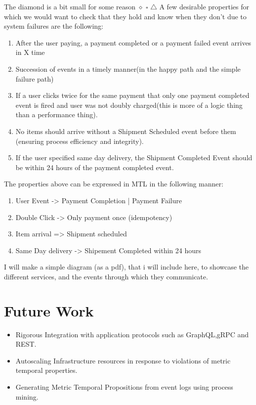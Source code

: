 \documentclass[twocolumn]{article}
\begin{document}
The diamond is a bit small for some reason
$\diamond$
$\square$
$\triangle$
A few desirable properties for which we would want to check that they hold and know when they don't due to
system failures are the following:
\begin{enumerate}
	\item After the user paying, a payment completed or a payment failed event arrives in X time
	\item Succession of events in a timely manner(in the happy path and the simple failure path)
	\item If a user clicks twice for the same payment that only one payment completed event is fired and user was not doubly charged(this is more of a logic thing than a performance thing).
	\item No items should arrive without a Shipment Scheduled event before them (ensuring process efficiency and integrity).
	\item If the user specified same day delivery, the Shipment Completed Event should be within 24 hours of the payment completed event.
\end{enumerate}
The properties above can be expressed in MTL in the following manner:
\begin{enumerate}
	\item User Event -> Payment Completion | Payment Failure
	\item Double Click -> Only payment once (idempotency)
	\item Item arrival => Shipment scheduled
	\item Same Day delivery -> Shipement Completed within 24 hours
\end{enumerate}
I will make a simple diagram (as a pdf), that i will include here, to showcase the different services, and the events through which they communicate.

\section{Future Work}
\begin{itemize}
	\item Rigorous Integration with application protocols such as GraphQL,gRPC and REST.
	\item Autoscaling Infrastructure resources in response to violations of metric temporal properties.
	\item Generating Metric Temporal Propositions from event logs using process mining.
\end{itemize}




\end{document}
